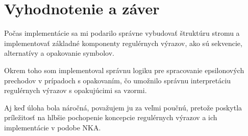 \documentclass[a4paper,12pt]{article}
\begin{document}
\section{Vyhodnotenie a záver}

Počas implementácie sa mi podarilo správne vybudovať štruktúru stromu a implementovať základné komponenty regulérnych výrazov, ako sú sekvencie, alternatívy a opakovanie symbolov. 

Okrem toho som implementoval správnu logiku pre spracovanie epsilonových prechodov v prípadoch s opakovaním, čo umožnilo správnu interpretáciu regulérnych výrazov s opakujúcimi sa vzormi.

Aj keď úloha bola náročná, považujem ju za veľmi poučnú, pretože poskytla príležitosť na hlbšie pochopenie koncepcie regulérnych výrazov a ich implementácie v podobe NKA.
\end{document}
